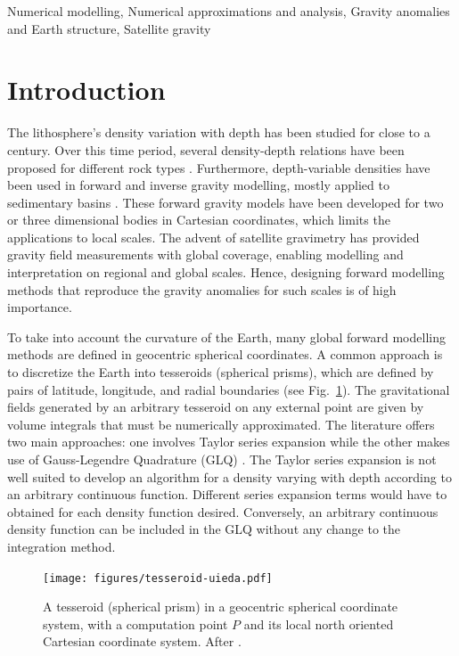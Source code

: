\documentclass[extra, referee]{gji}
\begin{document}
\begin{keywords}
Numerical modelling, Numerical approximations and analysis, Gravity anomalies
and Earth structure, Satellite gravity
\end{keywords}


\section{Introduction}

The lithosphere's density variation with depth has been studied for close to a
century.
Over this time period,
several density-depth relations have been proposed for different rock types
\citep[e.g.][]{Maxant1980, Rao1986, Rao1993, Rao1994}.
Furthermore, depth-variable densities have been used in forward and
inverse gravity modelling, mostly applied to sedimentary basins
\citep{Cordell1973, Rao1986, Cowie1990, Rao1993, Rao1994, Zhang2001,
Welford2010}.
These forward gravity models have been developed for two or three dimensional
bodies in Cartesian coordinates, which limits the applications to local scales.
The advent of satellite gravimetry has provided gravity field
measurements with global coverage, enabling modelling and interpretation on regional and
global scales.
Hence, designing forward modelling methods that reproduce the gravity anomalies for
such scales is of high importance.

To take into account the curvature of the Earth, many global forward modelling methods
are defined in geocentric spherical coordinates.
A common approach is to discretize the Earth into tesseroids (spherical prisms),
which are defined by pairs of latitude, longitude, and
radial boundaries (see Fig.~\ref{fig:tesseroid}).
The gravitational fields generated by an arbitrary
tesseroid on any external point are given by volume
integrals that must be numerically approximated.
The literature offers two main approaches: one involves Taylor series expansion
\citep{Heck2007, Grombein2013} while the other makes use of Gauss-Legendre
Quadrature (GLQ)
\citep{Asgharzadeh2007, Wild-Pfeiffer2008, Li2011, Uieda2016}.
The Taylor series expansion is not well suited to develop an algorithm for
a density varying with depth according to an arbitrary continuous function.
Different series expansion terms would have to obtained for each density function
desired.
Conversely, an arbitrary continuous density function can be included in the GLQ without
any change to the integration method.

\begin{figure}
\centering
\texttt{[image: figures/tesseroid-uieda.pdf]}
\caption{
    A tesseroid (spherical prism) in a geocentric spherical coordinate system, with a
    computation point $P$ and its local north oriented Cartesian coordinate system.
    After \citet{Uieda2015}.
}
\label{fig:tesseroid}
\end{figure}
\end{document}

